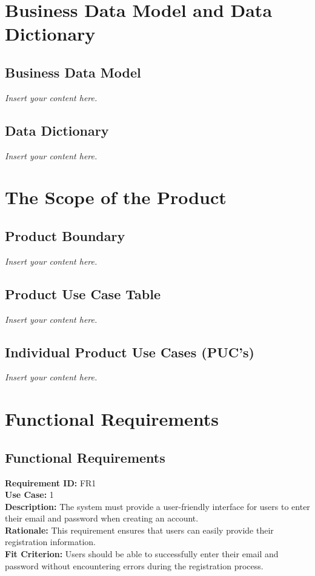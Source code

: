 \documentclass[12pt]{article}
\newcommand{\lips}{\textit{Insert your content here.}}
\begin{document}
\section{Business Data Model and Data Dictionary}
\subsection{Business Data Model}
\lips
\subsection{Data Dictionary}
\lips

\section{The Scope of the Product}
\subsection{Product Boundary}
\lips
\subsection{Product Use Case Table}
\lips
\subsection{Individual Product Use Cases (PUC's)}
\lips

\section{Functional Requirements}
\subsection{Functional Requirements}
\medskip
\noindent \textbf{Requirement ID:} FR1\\
\textbf{Use Case:} 1\\
\textbf{Description:} The system must provide a user-friendly interface for users to enter their email and password when creating an account.\\
\textbf{Rationale:} This requirement ensures that users can easily provide their registration information.\\
\textbf{Fit Criterion:} Users should be able to successfully enter their email and password without encountering errors during the registration process.\\
\end{document}
